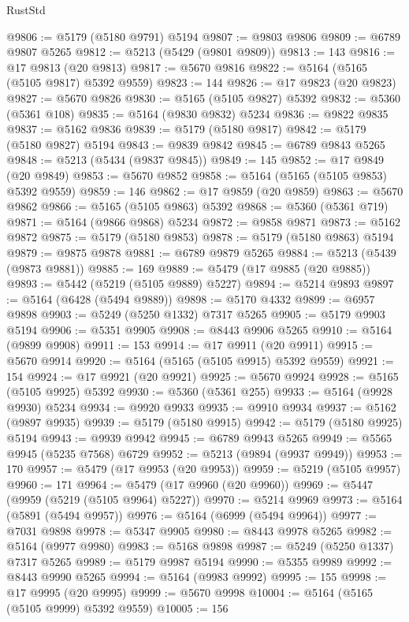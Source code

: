 \begin{lexlean}{RustStd}
\begin{coremodule}
@9806 := @5179 (@5180 @9791) @5194
@9807 := @9803 @9806
@9809 := @6789 @9807 @5265
@9812 := @5213 (@5429 (@9801 @9809))
@9813 := 143
@9816 := @17 @9813 (@20 @9813)
@9817 := @5670 @9816
@9822 := @5164 (@5165 (@5105 @9817) @5392 @9559)
@9823 := 144
@9826 := @17 @9823 (@20 @9823)
@9827 := @5670 @9826
@9830 := @5165 (@5105 @9827) @5392
@9832 := @5360 (@5361 @108)
@9835 := @5164 (@9830 @9832) @5234
@9836 := @9822 @9835
@9837 := @5162 @9836
@9839 := @5179 (@5180 @9817)
@9842 := @5179 (@5180 @9827) @5194
@9843 := @9839 @9842
@9845 := @6789 @9843 @5265
@9848 := @5213 (@5434 (@9837 @9845))
@9849 := 145
@9852 := @17 @9849 (@20 @9849)
@9853 := @5670 @9852
@9858 := @5164 (@5165 (@5105 @9853) @5392 @9559)
@9859 := 146
@9862 := @17 @9859 (@20 @9859)
@9863 := @5670 @9862
@9866 := @5165 (@5105 @9863) @5392
@9868 := @5360 (@5361 @719)
@9871 := @5164 (@9866 @9868) @5234
@9872 := @9858 @9871
@9873 := @5162 @9872
@9875 := @5179 (@5180 @9853)
@9878 := @5179 (@5180 @9863) @5194
@9879 := @9875 @9878
@9881 := @6789 @9879 @5265
@9884 := @5213 (@5439 (@9873 @9881))
@9885 := 169
@9889 := @5479 (@17 @9885 (@20 @9885))
@9893 := @5442 (@5219 (@5105 @9889) @5227)
@9894 := @5214 @9893
@9897 := @5164 (@6428 (@5494 @9889))
@9898 := @5170 @4332
@9899 := @6957 @9898
@9903 := @5249 (@5250 @1332) @7317 @5265
@9905 := @5179 @9903 @5194
@9906 := @5351 @9905
@9908 := @8443 @9906 @5265
@9910 := @5164 (@9899 @9908)
@9911 := 153
@9914 := @17 @9911 (@20 @9911)
@9915 := @5670 @9914
@9920 := @5164 (@5165 (@5105 @9915) @5392 @9559)
@9921 := 154
@9924 := @17 @9921 (@20 @9921)
@9925 := @5670 @9924
@9928 := @5165 (@5105 @9925) @5392
@9930 := @5360 (@5361 @255)
@9933 := @5164 (@9928 @9930) @5234
@9934 := @9920 @9933
@9935 := @9910 @9934
@9937 := @5162 (@9897 @9935)
@9939 := @5179 (@5180 @9915)
@9942 := @5179 (@5180 @9925) @5194
@9943 := @9939 @9942
@9945 := @6789 @9943 @5265
@9949 := @5565 @9945 (@5235 @7568) @6729
@9952 := @5213 (@9894 (@9937 @9949))
@9953 := 170
@9957 := @5479 (@17 @9953 (@20 @9953))
@9959 := @5219 (@5105 @9957)
@9960 := 171
@9964 := @5479 (@17 @9960 (@20 @9960))
@9969 := @5447 (@9959 (@5219 (@5105 @9964) @5227))
@9970 := @5214 @9969
@9973 := @5164 (@5891 (@5494 @9957))
@9976 := @5164 (@6999 (@5494 @9964))
@9977 := @7031 @9898
@9978 := @5347 @9905
@9980 := @8443 @9978 @5265
@9982 := @5164 (@9977 @9980)
@9983 := @5168 @9898
@9987 := @5249 (@5250 @1337) @7317 @5265
@9989 := @5179 @9987 @5194
@9990 := @5355 @9989
@9992 := @8443 @9990 @5265
@9994 := @5164 (@9983 @9992)
@9995 := 155
@9998 := @17 @9995 (@20 @9995)
@9999 := @5670 @9998
@10004 := @5164 (@5165 (@5105 @9999) @5392 @9559)
@10005 := 156

\end{coremodule}
\end{lexlean}
